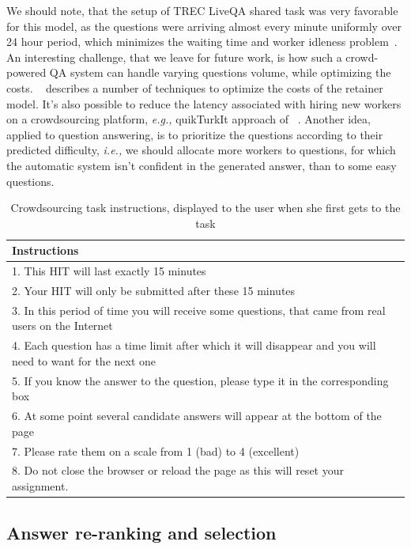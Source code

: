 \documentclass[letterpaper]{article}
\makeatletter
\newcommand{\eg}{\textit{e.g.,}\@\xspace}
\newcommand{\ie}{\textit{i.e.,}\@\xspace}
\makeatother
\begin{document}
We should note, that the setup of TREC LiveQA shared task was very favorable for this model, as the questions were arriving almost every minute uniformly over 24 hour period, which minimizes the waiting time and worker idleness problem~\cite{Lasecki:2013:CCC:2501988.2502057}.
An interesting challenge, that we leave for future work, is how such a crowd-powered QA system can handle varying questions volume, while optimizing the costs.
~\cite{bernstein2012analytic} describes a number of techniques to optimize the costs of the retainer model.
It's also possible to reduce the latency associated with hiring new workers on a crowdsourcing platform, \eg quikTurkIt approach of ~\cite{bigham2010vizwiz}.
Another idea, applied to question answering, is to prioritize the questions according to their predicted difficulty, \ie we should allocate more workers to questions, for which the automatic system isn't confident in the generated answer, than to some easy questions.

\begin{table}[ht]
\centering
\begin{tabular}{| p{8cm} |}
\hline
\textbf{Instructions} \\
\hline
1. This HIT will last exactly 15 minutes\\
2. Your HIT will only be submitted after these 15 minutes\\
3. In this period of time you will receive some questions, that came from real users on the Internet\\
4. Each question has a time limit after which it will disappear and you will need to want for the next one\\
5. If you know the answer to the question, please type it in the corresponding box\\
6. At some point several candidate answers will appear at the bottom of the page\\
7. Please rate them on a scale from 1 (bad) to 4 (excellent)\\
8. Do not close the browser or reload the page as this will reset your assignment.\\
\hline
\end{tabular}
\caption{Crowdsourcing task instructions, displayed to the user when she first gets to the task}
\label{table:crowd_instructions}
\end{table}

\subsection{Answer re-ranking and selection}
\label{sec:system:reranking}
\end{document}
